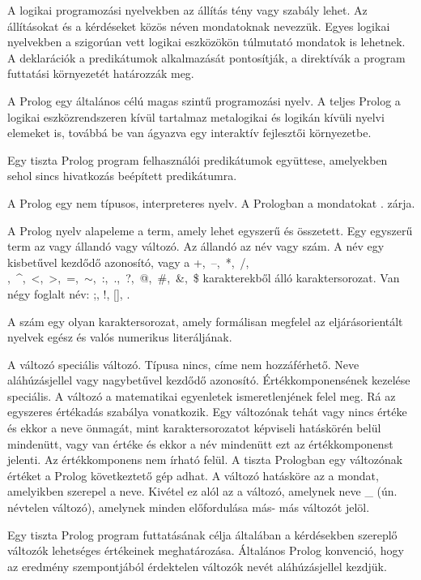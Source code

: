 A logikai programozási nyelvekben az állítás tény vagy szabály lehet. Az állításokat és a kérdéseket közös néven mondatoknak nevezzük. Egyes logikai nyelvekben a szigorúan vett logikai eszközökön túlmutató mondatok is lehetnek. A deklarációk a predikátumok alkalmazását pontosítják, a direktívák a program futtatási környezetét határozzák meg. 

A Prolog egy általános célú magas szintű programozási nyelv. A teljes Prolog a logikai eszközrendszeren kívül tartalmaz metalogikai és logikán kívüli nyelvi elemeket is, továbbá be van ágyazva egy interaktív fejlesztői környezetbe. 

Egy tiszta Prolog program felhasználói predikátumok együttese, amelyekben sehol sincs hivatkozás beépített predikátumra. 

A Prolog egy nem típusos, interpreteres nyelv. A Prologban a mondatokat . zárja. 

A Prolog nyelv alapeleme a term, amely lehet egyszerű és összetett. Egy egyszerű term az vagy állandó vagy változó. Az állandó az név vagy szám. A név egy kisbetűvel kezdődő azonosító, vagy a +,~–,~*,~/,~\\,~\textasciicircum,~<,~>,~=,~$\sim$,~:,~.,~?,~@,~\#,~\&,~\$ karakterekből álló karaktersorozat. Van négy foglalt név: ;, !, [], {}. 

A szám egy olyan karaktersorozat, amely formálisan megfelel az eljárásorientált nyelvek egész és valós numerikus literáljának. 

A változó speciális változó. Típusa nincs, címe nem hozzáférhető. Neve aláhúzásjellel vagy nagybetűvel kezdődő azonosító. Értékkomponensének kezelése speciális. A változó a matematikai egyenletek ismeretlenjének felel meg. Rá az egyszeres értékadás szabálya vonatkozik. Egy változónak tehát vagy nincs értéke és ekkor a neve önmagát, mint karaktersorozatot képviseli hatáskörén belül mindenütt, vagy van értéke és ekkor a név mindenütt ezt az értékkomponenst jelenti. Az értékkomponens nem írható felül. A tiszta Prologban egy változónak értéket a Prolog következtető gép adhat. A változó hatásköre az a mondat, amelyikben szerepel a neve. Kivétel ez alól az a változó, amelynek neve \_ (ún. névtelen változó), amelynek minden előfordulása más- más változót jelöl. 

Egy tiszta Prolog program futtatásának célja általában a kérdésekben szereplő változók lehetséges értékeinek meghatározása. Általános Prolog konvenció, hogy az eredmény szempontjából érdektelen változók nevét aláhúzásjellel kezdjük. 

